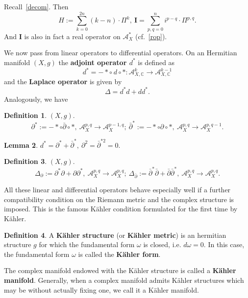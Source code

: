 \documentclass{article}
\theoremstyle{definition}
\newtheorem{definition}{Definition}[subsection]
\theoremstyle{plain}
\newtheorem{lemma}[definition]{Lemma}
\begin{document}
Recall~\ref{decom}. Then\[
    H:=\sum^{2n}_{k=0}(k-n)\cdot\varPi^k,\ \mathrm{\mathbf{I}}=\sum^{n}_{p,q=0}i^{p-q}\cdot\varPi^{p,q}.
\]And $ \mathrm{\mathbf{I}} $ is also in fact a real operator on $ \mathcal{A}^*_X $ (cf.~\ref{rop}).

We now pass from linear operators to differential operators. On an Hermitian manifold $ (X,g) $ the \textbf{adjoint operator $ d^* $} is defined as \[
    d^*=-*\circ\ d\circ *:\mathcal{A}^k_{X,\mathbb{C}}\rightarrow \mathcal{A}^{k-1}_{X,\mathbb{C}}
\]and the \textbf{Laplace operator} is given by\[
    \varDelta=d^* d+dd^*.
\]Analogously, we have 

\begin{definition}
    $ (X,g) $. \[
        \partial^*:=-*\circ \bar{\partial}\circ *,\ \mathcal{A}^{p,q}_X\rightarrow\mathcal{A}^{p-1,q}_X;\ \bar{\partial}^*:=-*\circ\partial\circ *,\ \mathcal{A}^{p,q}_X\rightarrow\mathcal{A}^{p,q-1}_X.
    \]
\end{definition}

\begin{lemma}
    $ d^*=\partial^*+\bar{\partial}^*,\ \partial^2=\bar{\partial}^{*2}=0. $
\end{lemma}

\begin{definition}
    $ (X,g) $.\[
        \varDelta_{\partial}:=\partial^* \partial+\partial\partial^*,\ \mathcal{A}^{p,q}_X\rightarrow\mathcal{A}^{p,q}_X;\ \varDelta_{\bar{\partial}}:=\bar{\partial}^*\bar{\partial}+\bar{\partial}\bar{\partial}^*,\ \mathcal{A}^{p,q}_X\rightarrow\mathcal{A}^{p,q}_X.
    \]
\end{definition}

All these linear and differential operators behave especially well if a further compatibility condition on the Riemann metric and the complex structure is imposed. This is the famous K\"{a}hler condition formulated for the first time by K\"{a}hler.

\begin{definition}
    A \textbf{K\"{a}hler structure} (or \textbf{K\"{a}hler metric}) is an hermitian structure $ g $ for which the fundamental form $ \omega $ is closed, i.e. $ d\omega=0 $. In this case, the fundamental form $ \omega $ is called the \textbf{K\"{a}hler form}.
\end{definition}

The complex manifold endowed with the K\"{a}hler structure is called a \textbf{K\"{a}hler manifold}. Generally, when a complex manifold admits K\"{a}hler structures which may be without actually fixing one, we call it a K\"{a}hler manifold.
\end{document}
